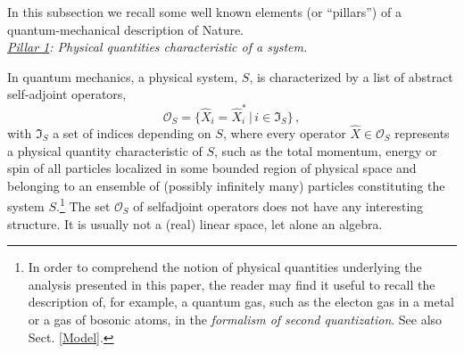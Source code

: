 \documentclass[a4paper,11pt]{article}
\begin{document}
In this subsection we recall some well known elements (or ``pillars'') of a quantum-mechanical description of Nature.\\

\textit{\underline{Pillar 1}: Physical quantities characteristic of a system.}

In quantum mechanics, a physical system, $S$, is characterized by a list of abstract self-adjoint operators,
\begin{equation}\label{phys quantities}
\mathcal{O}_{S}= \big\{\hat{X}_i = \hat{X}^{*}_i\,\vert\, i \in \mathfrak{I}_S\big\}\,,
\end{equation}
with $\mathfrak{I}_S$ a set of indices depending on $S$, where every operator $\hat{X} \in \mathcal{O}_S$ represents a 
physical quantity characteristic of $S$, such as the total momentum, energy or spin of all particles localized in some bounded 
region of physical space and belonging to an ensemble of (possibly infinitely many) particles constituting the system $S$.\footnote{In order to comprehend the notion of physical quantities underlying the analysis presented in this paper, the reader 
may find it useful to recall the description of, for example, a quantum gas, such as the electon gas in a metal or a gas of 
bosonic atoms, in the \textit{formalism of second quantization}. See also Sect. \ref{Model}.} The set $\mathcal{O}_S$ of selfadjoint operators does not have any interesting structure. It is usually not a (real) linear space, let alone an algebra. 
\end{document}
